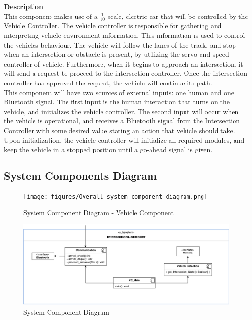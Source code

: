 \documentclass [10pt]{article}
\begin{document}
\textbf{Description} \\
This component makes use of a $\frac{1 }{10}$ scale, electric car that will be controlled by the Vehicle Controller. The vehicle controller is responsible for gathering and interpreting vehicle environment information. This information is used to control the vehicles behaviour. %
The vehicle will follow the lanes of the track, and stop when an intersection or obstacle is present, by utilizing the servo and speed controller of vehicle. Furthermore, when it begins to approach an intersection, it will send a request to proceed to the intersection controller. Once the intersection controller has approved the request,  the vehicle will continue its path. \\

This component will have two sources of external inputs: one human and one Bluetooth signal. The first input is the human interaction that turns on the vehicle, and initializes the vehicle controller. The second input will occur when the vehicle is operational, and receives a Bluetooth signal from the Intersection Controller with some desired value stating an action that vehicle should take. \\

Upon initialization, the vehicle controller will initialize all required modules, and keep the vehicle in a stopped position until a go-ahead signal is given.

\subsection{System Components Diagram}


\begin{figure} [h!]
	\caption{System Component Diagram - Vehicle Component} \bigskip
	\hspace*{-1.5cm}
	\texttt{[image: figures/Overall\_system\_component\_diagram.png]}

    
\end{figure}

\pagebreak
\begin{figure} [h!]
	\caption{System Component Diagram} \bigskip
	\hspace*{-1.5cm}
	\includegraphics [scale =0.55] {figures/componDiagram2.pdf}

    
\end{figure}
\end{document}
